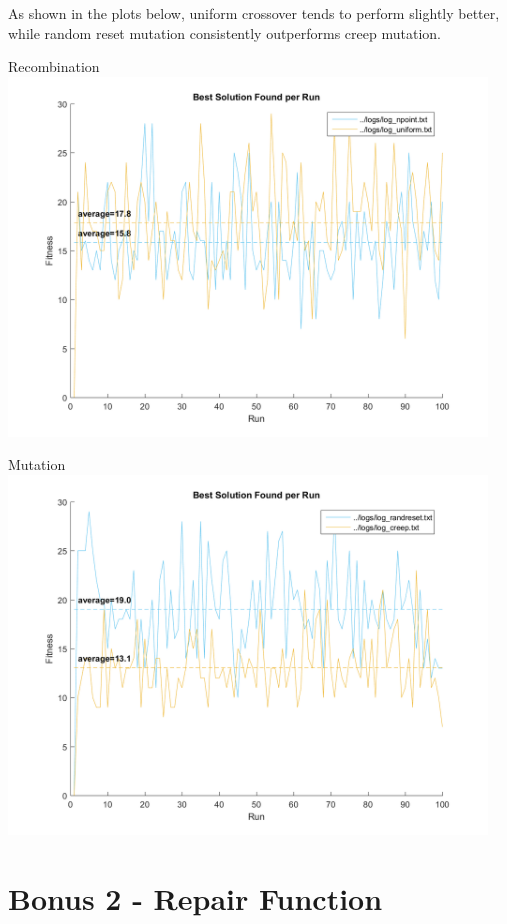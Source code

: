 \documentclass[11pt]{article}
\begin{document}
As shown in the plots below, uniform crossover tends to perform slightly better, while random reset mutation consistently outperforms creep mutation.
\begin{center}
	\newpage Recombination\\
	\includegraphics[width=5in]{graph_bonus1_recombination.png}
\end{center}
\begin{center}
	Mutation\\
	\includegraphics[width=5in]{graph_bonus1_mutation.png}
\end{center}
	
\newpage\section{Bonus 2 - Repair Function}\indent
	
\end{document}
